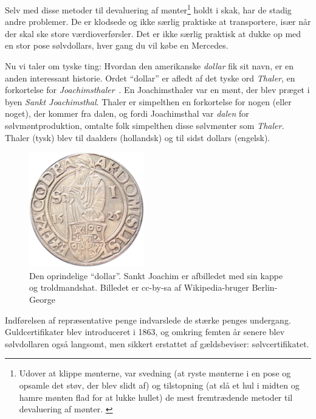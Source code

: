\documentclass[paper=6in:9in,pagesize=pdftex,headinclude=on,footinclude=on,12pt]{scrbook}
\begin{document}
Selv med disse metoder til devaluering af mønter\footnote{Udover at klippe mønterne, var svedning (at ryste mønterne i en pose og opsamle det støv, der blev slidt af) og tilstopning (at slå et hul i midten og hamre mønten flad for at lukke hullet) de mest fremtrædende metoder til devaluering af mønter. \cite{wiki:coin-debasement}} holdt i skak, har de stadig andre problemer. De er klodsede og ikke særlig praktiske at transportere, især når der skal ske store værdioverførsler. Det er ikke særlig praktisk at dukke op med en stor pose sølvdollars, hver gang du vil købe en Mercedes.

Nu vi taler om tyske ting: Hvordan den amerikanske \textit{dollar} fik sit navn, er en anden interessant historie. Ordet \enquote{dollar} er afledt af det tyske ord \textit{Thaler}, en forkortelse for \textit{Joachimsthaler}~\cite{wiki:thaler}. En Joachimsthaler var en mønt, der blev præget i byen \textit{Sankt Joachimsthal}. Thaler er simpelthen en forkortelse for nogen (eller noget), der kommer fra dalen, og fordi Joachimsthal var \textit{dalen} for sølvmøntproduktion, omtalte folk simpelthen disse sølvmønter som \textit{Thaler.} Thaler (tysk) blev til daalders (hollandsk) og til sidst dollars (engelsk).\begin{figure}
  \centering
  \includegraphics[width=5cm]{assets/images/joachimsthaler.png}
  \caption{Den oprindelige \enquote{dollar}. Sankt Joachim er afbilledet med sin kappe og troldmandshat. Billedet er cc-by-sa af Wikipedia-bruger Berlin-George}
  \label{fig:joachimsthaler}
\end{figure}

Indførelsen af repræsentative penge indvarslede de stærke penges undergang. Guldcertifikater blev introduceret i 1863, og omkring femten år senere blev sølvdollaren også langsomt, men sikkert erstattet af gældsbeviser: sølvcertifikatet. \cite{wiki:silver-certificate}
\end{document}
